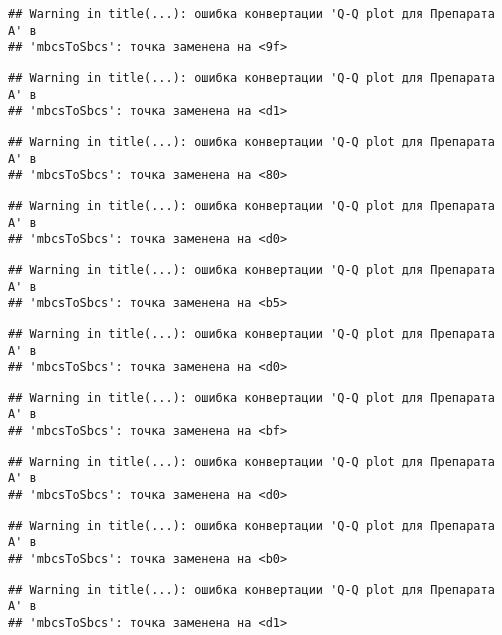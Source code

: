 \documentclass[
]{article}
\begin{document}
\begin{verbatim}
## Warning in title(...): ошибка конвертации 'Q-Q plot для Препарата A' в
## 'mbcsToSbcs': точка заменена на <9f>
\end{verbatim}

\begin{verbatim}
## Warning in title(...): ошибка конвертации 'Q-Q plot для Препарата A' в
## 'mbcsToSbcs': точка заменена на <d1>
\end{verbatim}

\begin{verbatim}
## Warning in title(...): ошибка конвертации 'Q-Q plot для Препарата A' в
## 'mbcsToSbcs': точка заменена на <80>
\end{verbatim}

\begin{verbatim}
## Warning in title(...): ошибка конвертации 'Q-Q plot для Препарата A' в
## 'mbcsToSbcs': точка заменена на <d0>
\end{verbatim}

\begin{verbatim}
## Warning in title(...): ошибка конвертации 'Q-Q plot для Препарата A' в
## 'mbcsToSbcs': точка заменена на <b5>
\end{verbatim}

\begin{verbatim}
## Warning in title(...): ошибка конвертации 'Q-Q plot для Препарата A' в
## 'mbcsToSbcs': точка заменена на <d0>
\end{verbatim}

\begin{verbatim}
## Warning in title(...): ошибка конвертации 'Q-Q plot для Препарата A' в
## 'mbcsToSbcs': точка заменена на <bf>
\end{verbatim}

\begin{verbatim}
## Warning in title(...): ошибка конвертации 'Q-Q plot для Препарата A' в
## 'mbcsToSbcs': точка заменена на <d0>
\end{verbatim}

\begin{verbatim}
## Warning in title(...): ошибка конвертации 'Q-Q plot для Препарата A' в
## 'mbcsToSbcs': точка заменена на <b0>
\end{verbatim}

\begin{verbatim}
## Warning in title(...): ошибка конвертации 'Q-Q plot для Препарата A' в
## 'mbcsToSbcs': точка заменена на <d1>
\end{verbatim}
\end{document}
